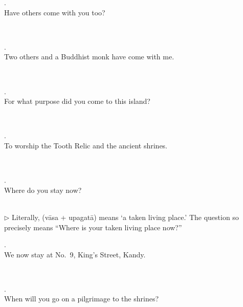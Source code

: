 \medskip
\parbox[lt]{0.93\linewidth}{\raggedright{}. \\
\hspace*{6mm}Have others come with you too?}\\[1mm]

\medskip
\parbox[lt]{0.93\linewidth}{\raggedright{}. \\
\hspace*{6mm}Two others and a Buddhist monk have come with me.}\\[1mm]

\medskip
\parbox[lt]{0.93\linewidth}{\raggedright{}. \\
\hspace*{6mm}For what purpose did you come to this island?}\\[1mm]

\medskip
\parbox[lt]{0.93\linewidth}{\raggedright{}. \\
\hspace*{6mm}To worship the Tooth Relic and the ancient shrines.}\\[1mm]

\medskip
\parbox[lt]{0.93\linewidth}{\raggedright{}. \\
\hspace*{6mm}Where do you stay now?}\\[1mm]
{\small $\triangleright$ Literally,  (v\=asa + upagat\=a) means `a taken living place.' The question so precisely means ``Where is your taken living place now?''}

\medskip
\parbox[lt]{0.93\linewidth}{\raggedright{}. \\
\hspace*{6mm}We now stay at No.\ 9, King's Street, Kandy.}\\[1mm]

\medskip
\parbox[lt]{0.93\linewidth}{\raggedright{}. \\
\hspace*{6mm}When will you go on a pilgrimage to the shrines?}\\[1mm]

